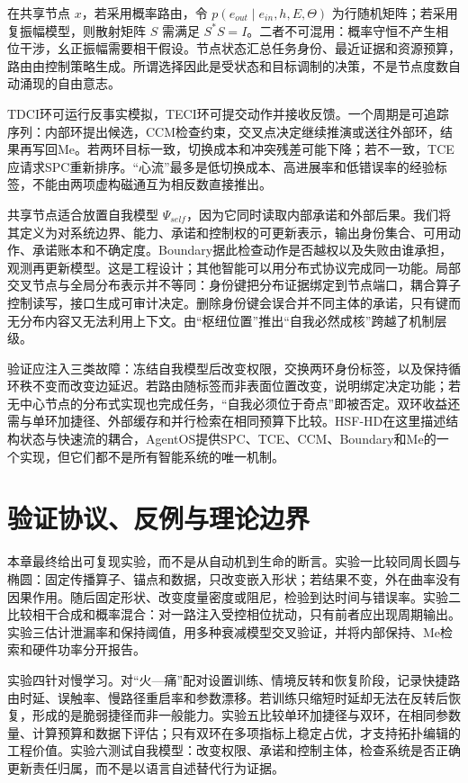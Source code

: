 在共享节点 $x$，若采用概率路由，令 $p(e_{out}\mid e_{in},h,E,\Theta)$ 为行随机矩阵；若采用复振幅模型，则散射矩阵 $S$ 需满足 $S^*S=I$。二者不可混用：概率守恒不产生相位干涉，幺正振幅需要相干假设。节点状态汇总任务身份、最近证据和资源预算，路由由控制策略生成。所谓选择因此是受状态和目标调制的决策，不是节点度数自动涌现的自由意志。

TDCI环可运行反事实模拟，TECI环可提交动作并接收反馈。一个周期是可追踪序列：内部环提出候选，CCM检查约束，交叉点决定继续推演或送往外部环，结果再写回Me。若两环目标一致，切换成本和冲突残差可能下降；若不一致，TCE应请求SPC重新排序。“心流”最多是低切换成本、高进展率和低错误率的经验标签，不能由两项虚构磁通互为相反数直接推出。

共享节点适合放置自我模型 $\Psi_{self}$，因为它同时读取内部承诺和外部后果。我们将其定义为对系统边界、能力、承诺和控制权的可更新表示，输出身份集合、可用动作、承诺账本和不确定度。Boundary据此检查动作是否越权以及失败由谁承担，观测再更新模型。这是工程设计；其他智能可以用分布式协议完成同一功能。局部交叉节点与全局分布表示并不等同：身份键把分布证据绑定到节点端口，耦合算子控制读写，接口生成可审计决定。删除身份键会误合并不同主体的承诺，只有键而无分布内容又无法利用上下文。由“枢纽位置”推出“自我必然成核”跨越了机制层级。

验证应注入三类故障：冻结自我模型后改变权限，交换两环身份标签，以及保持循环秩不变而改变边延迟。若路由随标签而非表面位置改变，说明绑定决定功能；若无中心节点的分布式实现也完成任务，“自我必须位于奇点”即被否定。双环收益还需与单环加捷径、外部缓存和并行检索在相同预算下比较。HSF-HD在这里描述结构状态与快速流的耦合，AgentOS提供SPC、TCE、CCM、Boundary和Me的一个实现，但它们都不是所有智能系统的唯一机制。

\section{验证协议、反例与理论边界}
\label{sec:conclusion_1d_resonator}

本章最终给出可复现实验，而不是从自动机到生命的断言。实验一比较同周长圆与椭圆：固定传播算子、锚点和数据，只改变嵌入形状；若结果不变，外在曲率没有因果作用。随后固定形状、改变度量密度或阻尼，检验到达时间与错误率。实验二比较相干合成和概率混合：对一路注入受控相位扰动，只有前者应出现周期输出。实验三估计泄漏率和保持阈值，用多种衰减模型交叉验证，并将内部保持、Me检索和硬件功率分开报告。

实验四针对慢学习。对“火—痛”配对设置训练、情境反转和恢复阶段，记录快捷路由时延、误触率、慢路径重启率和参数漂移。若训练只缩短时延却无法在反转后恢复，形成的是脆弱捷径而非一般能力。实验五比较单环加捷径与双环，在相同参数量、计算预算和数据下评估；只有双环在多项指标上稳定占优，才支持拓扑编辑的工程价值。实验六测试自我模型：改变权限、承诺和控制主体，检查系统是否正确更新责任归属，而不是以语言自述替代行为证据。

